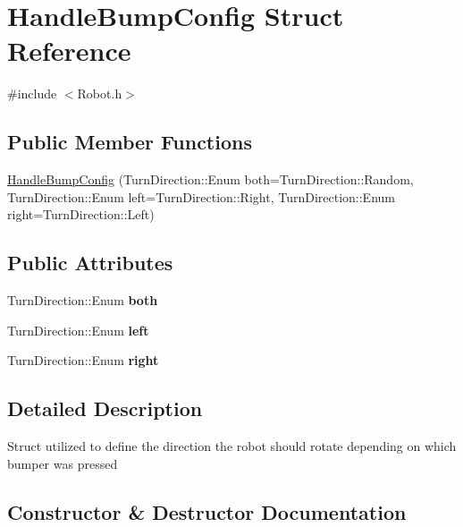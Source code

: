 \hypertarget{structHandleBumpConfig}{}\section{Handle\+Bump\+Config Struct Reference}
\label{structHandleBumpConfig}


{\ttfamily \#include $<$Robot.\+h$>$}

\subsection*{Public Member Functions}
\begin{DoxyCompactItemize}
\item 
\hyperlink{structHandleBumpConfig_a087d0372f08d710d3d93430cff3322ce}{Handle\+Bump\+Config} (Turn\+Direction\+::\+Enum both=Turn\+Direction\+::\+Random, Turn\+Direction\+::\+Enum left=Turn\+Direction\+::\+Right, Turn\+Direction\+::\+Enum right=Turn\+Direction\+::\+Left)
\end{DoxyCompactItemize}
\subsection*{Public Attributes}
\begin{DoxyCompactItemize}
\item 
\mbox{\label{structHandleBumpConfig_a9c3c43d0add0d93a1ff6ff9428abaa19}} 
Turn\+Direction\+::\+Enum {\bfseries both}
\item 
\mbox{\label{structHandleBumpConfig_aa7950ff5fe8ab88916e26361cf017949}} 
Turn\+Direction\+::\+Enum {\bfseries left}
\item 
\mbox{\label{structHandleBumpConfig_a4328fe801ccfaf623a1f45aea7f073d4}} 
Turn\+Direction\+::\+Enum {\bfseries right}
\end{DoxyCompactItemize}


\subsection{Detailed Description}
Struct utilized to define the direction the robot should rotate depending on which bumper was pressed 

\subsection{Constructor \& Destructor Documentation}
\mbox{\label{structHandleBumpConfig_a087d0372f08d710d3d93430cff3322ce}} 

